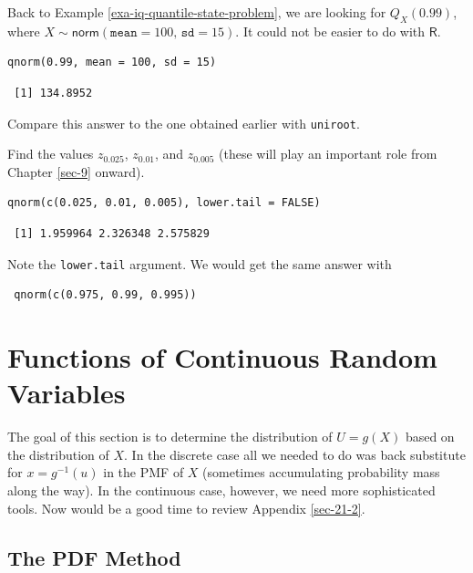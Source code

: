 \documentclass[captions=tableheading]{scrbook}
\begin{document}
\begin{example}
Back to Example \ref{exa-iq-quantile-state-problem}, we are looking for \(Q_{X}(0.99)\), where \(X\sim\mathsf{norm}(\mathtt{mean}=100,\,\mathtt{sd}=15)\). It could not be easier to do with \(\mathsf{R}\). 


\begin{verbatim}
qnorm(0.99, mean = 100, sd = 15)
\end{verbatim}

\begin{verbatim}
 [1] 134.8952
\end{verbatim}

Compare this answer to the one obtained earlier with \texttt{uniroot}.
\end{example}

\begin{example}
Find the values \(z_{0.025}\), \(z_{0.01}\), and \(z_{0.005}\) (these will play an important role from Chapter \ref{sec-9} onward).
\end{example}


\begin{verbatim}
qnorm(c(0.025, 0.01, 0.005), lower.tail = FALSE)
\end{verbatim}

\begin{verbatim}
 [1] 1.959964 2.326348 2.575829
\end{verbatim}

Note the \texttt{lower.tail} argument. We would get the same answer with
\begin{verbatim}
 qnorm(c(0.975, 0.99, 0.995))
\end{verbatim}
\section{Functions of Continuous Random Variables}
\label{sec-6-4}
\label{sec-Functions-of-Continuous}


The goal of this section is to determine the distribution of \(U=g(X)\) based on the distribution of \(X\). In the discrete case all we needed to do was back substitute for \(x=g^{-1}(u)\) in the PMF of \(X\) (sometimes accumulating probability mass along the way). In the continuous case, however, we need more sophisticated tools. Now would be a good time to review Appendix \ref{sec-21-2}.
\subsection{The PDF Method}
\label{sec-6-4-1}
\end{document}
